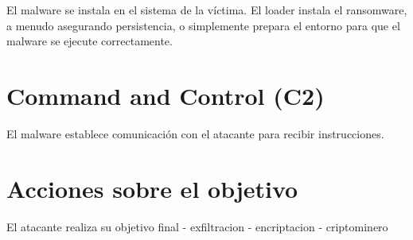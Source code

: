 El malware se instala en el sistema de la víctima.
El loader instala el ransomware, a menudo asegurando persistencia, o simplemente 
prepara el entorno para que el malware se ejecute correctamente.

\section{Command and Control (C2)}

El malware establece comunicación con el atacante para recibir instrucciones.

\section{Acciones sobre el objetivo}

El atacante realiza su objetivo final
- exfiltracion
- encriptacion
- criptominero